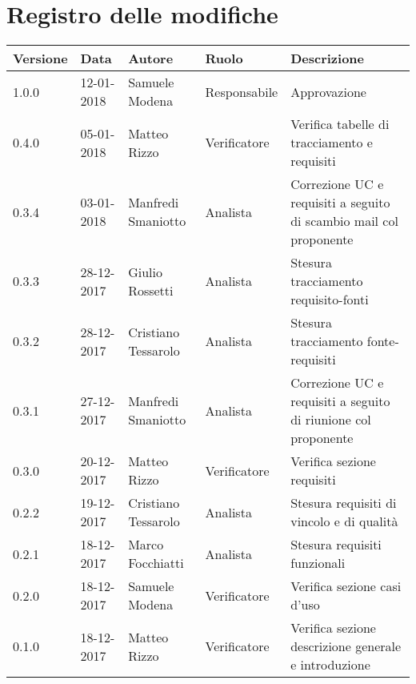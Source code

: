 \documentclass[./AnalisideiRequisiti.tex]{subfiles}
\begin{document}
	
{
	\chapter*{Registro delle modifiche}

\setlength\LTleft{-22mm}
	\begin{longtable}{|p{20mm}|p{20mm}|p{40mm}|p{30mm}|p{50mm}|}
		\hline
		\textbf{Versione} & \textbf{Data} & \textbf{Autore} & \textbf{Ruolo} & \textbf{Descrizione} \\ \hline 
		1.0.0 & 12-01-2018 & Samuele Modena & Responsabile & Approvazione\\ \hline
		0.4.0 & 05-01-2018 & Matteo Rizzo & Verificatore & Verifica tabelle di tracciamento e requisiti\\ \hline
		0.3.4 & 03-01-2018 & Manfredi Smaniotto & Analista & Correzione UC e requisiti a seguito di scambio mail col proponente \\ \hline		
		0.3.3 & 28-12-2017 & Giulio Rossetti & Analista & Stesura tracciamento requisito-fonti\\ \hline	
		0.3.2 & 28-12-2017 & Cristiano Tessarolo & Analista & Stesura tracciamento fonte-requisiti\\ \hline
		0.3.1 & 27-12-2017 & Manfredi Smaniotto & Analista & Correzione UC e requisiti a seguito di riunione col proponente\\ \hline
	   	0.3.0 & 20-12-2017 & Matteo Rizzo & Verificatore & Verifica sezione requisiti\\ \hline
		
		0.2.2 & 19-12-2017 & Cristiano Tessarolo & Analista & Stesura requisiti di vincolo e di qualità\\ \hline
		
		0.2.1 & 18-12-2017 & Marco Focchiatti & Analista & Stesura requisiti funzionali \\ \hline
			
		0.2.0 & 18-12-2017 & Samuele Modena & Verificatore & Verifica sezione casi d’uso\\ \hline
		0.1.0 & 18-12-2017 & Matteo Rizzo & Verificatore & Verifica sezione descrizione generale e introduzione  \\ \hline
	

\end{longtable}}
\end{document}
